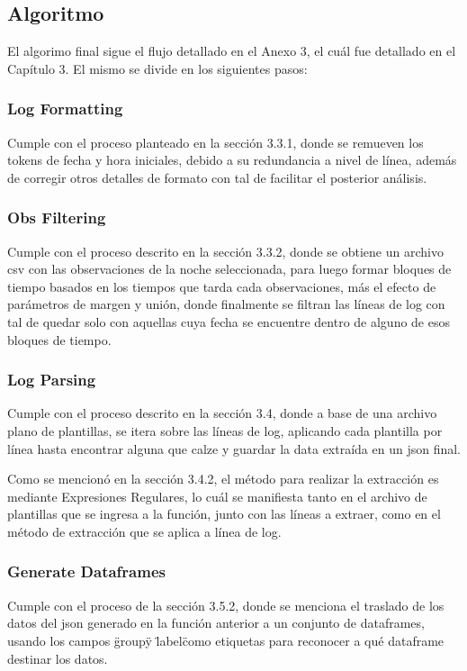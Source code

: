
\subsection{Algoritmo}

El algorimo final sigue el flujo detallado en el Anexo 3, el cuál fue detallado en el Capítulo 3. El mismo se divide en los siguientes pasos:

\subsubsection{Log Formatting}
Cumple con el proceso planteado en la sección 3.3.1, donde se remueven los tokens de fecha y hora iniciales, debido a su redundancia a nivel de línea, además de corregir otros detalles de formato con tal de facilitar el posterior análisis.

\subsubsection{Obs Filtering} 
Cumple con el proceso descrito en la sección 3.3.2, donde se obtiene un archivo csv con las observaciones de la noche seleccionada, para luego formar bloques de tiempo basados en los tiempos que tarda cada observaciones, más el efecto de parámetros de margen y unión, donde finalmente se filtran las líneas de log con tal de quedar solo con aquellas cuya fecha se encuentre dentro de alguno de esos bloques de tiempo.

\subsubsection{Log Parsing}
Cumple con el proceso descrito en la sección 3.4, donde a base de una archivo plano de plantillas, se itera sobre las líneas de log, aplicando cada plantilla por línea hasta encontrar alguna que calze y guardar la data extraída en un json final.

Como se mencionó en la sección 3.4.2, el método para realizar la extracción es mediante Expresiones Regulares, lo cuál se manifiesta tanto en el archivo de plantillas que se ingresa a la función, junto con las líneas a extraer, como en el método de extracción que se aplica a línea de log.

\subsubsection{Generate Dataframes} 
Cumple con el proceso de la sección 3.5.2, donde se menciona el traslado de los datos del json generado en la función anterior a un conjunto de dataframes, usando los campos \"group\" y \"label\" como etiquetas para reconocer a qué dataframe destinar los datos.

